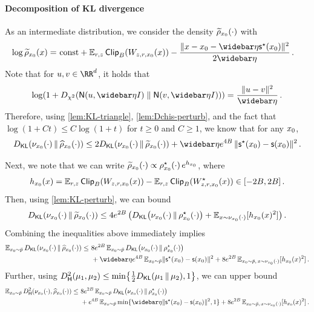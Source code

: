 \paragraph{Decomposition of KL divergence}
As an intermediate distribution, we consider the density $\rhotz{\cdot}$ with
\begin{align*}
    \log \rhotz{x}=&~\const+\En_{\lr,z}\pclip[\B]{\epxz}-\frac{\nrm{x-\xz-\etabar\scfs(\xz)}^2}{2\etabar}\,.
\end{align*}
Note that for $u,v\in\RR^d$, it holds that
\begin{align*}
    \log(1+\Dchis{\normal{u,\etabar\Id}}{\normal{v,\etabar\Id}})=\frac{\nrm{u-v}^2}{\etabar}\,.
\end{align*}
Therefore, using \cref{lem:KL-triangle}, \cref{lem:Dchis-perturb}, and the fact that $\log(1+Ct)\leq C\log(1+t)$ for $t\geq 0$ and $C\geq 1$, we know that for any $\xz$, 
\begin{align*}
    \Dkl{\piz{\cdot}}{\rhohz{\cdot}}
    \leq 2\Dkl{\piz{\cdot}}{\rhotz{\cdot}}+\etabar e^{4B}\, \nrm{\scfs(\xz)-\scf(\xz)}^2\,.
\end{align*}

Next, we note that we can write $\rhotz{\cdot}\propto \rhosz{\cdot}\,e^{h_{\xz}}$, where
\begin{align*}
    h_{\xz}(x)=\En_{\lr,z}\pclip[\B]{\epxz}-\En_{\lr,z}\pclip[\B]{\epsxz} \in [-2B,2B]\,.
\end{align*}
Then, using \cref{lem:KL-perturb}, we can bound 
\begin{align*}
    \Dkl{\piz{\cdot}}{\rhotz{\cdot}}
    \leq 4e^{2B}\,\prn[\big]{ \Dkl{\piz{\cdot}}{\rhosz{\cdot}}+\En_{x\sim \piz{\cdot}}[h_{\xz}(x)^2]}\,.
\end{align*}
Combining the inequalities above immediately implies
\begin{align}\label{pfeq:sc-err-KL-decomp}
\begin{aligned}
    \En_{\xz\sim \breve p}\Dkl{\piz{\cdot}}{\rhohz{\cdot}}
    \leq&~ 8e^{2B}\En_{\xz\sim \breve p}\Dkl{\piz{\cdot}}{\rhosz{\cdot}} \\
    &~+\etabar e^{4B} \En_{\xz\sim \breve p}\nrm{\scfs(\xz)-\scf(\xz)}^2
    +8e^{2B}\En_{\xz\sim \breve p,\, x\sim \piz{\cdot}}[h_{\xz}(x)^2]\,.
\end{aligned}
\end{align}
Further, using $\Dhels{\mu_1}{\mu_2}\leq \min\crl*{\frac12 \Dkl{\mu_1}{\mu_2},1}$, we can upper bound
\begin{align}\label{pfeq:sc-err-Hels-decomp}
    \begin{aligned}
    \En_{\xz\sim \breve p}\Dhels{\piz{\cdot}}{\rhohz{\cdot}}
    \leq&~ 8e^{2B}\En_{\xz\sim \breve p}\Dkl{\piz{\cdot}}{\rhosz{\cdot}} \\
    &~+e^{4B} \En_{\xz\sim \breve p}\min\crl{\etabar \nrm{\scfs(\xz)-\scf(\xz)}^2,1}
    +8e^{2B}\En_{\xz\sim \breve p,\, x\sim \piz{\cdot}}[h_{\xz}(x)^2]\,.
\end{aligned}
\end{align}

